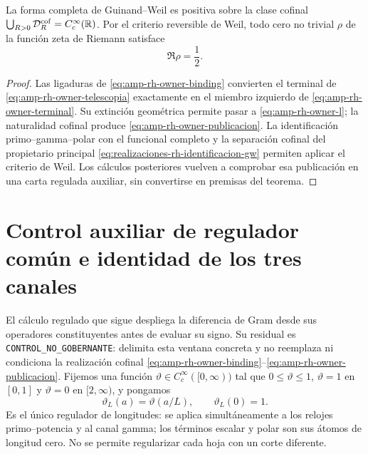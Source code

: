 \begin{theorem}
\label{thm:amp-rh-cierre-cofinal-propietario}
La forma completa de Guinand--Weil es positiva sobre la clase cofinal
\(\bigcup_{R>0}\mathcal D_R^{\rm cof}=C_c^\infty(\mathbb R)\). Por el
criterio reversible de Weil, todo cero no trivial \(\rho\) de la función
zeta de Riemann satisface
\[
 \Re\rho=\frac12.
\]
\end{theorem}

\begin{proof}
Las ligaduras de \eqref{eq:amp-rh-owner-binding} convierten el terminal de
\eqref{eq:amp-rh-owner-telescopia} exactamente en el miembro izquierdo de
\eqref{eq:amp-rh-owner-terminal}. Su extinción geométrica permite pasar a
\eqref{eq:amp-rh-owner-l}; la naturalidad cofinal produce
\eqref{eq:amp-rh-owner-publicacion}. La identificación primo--gamma--polar
con el funcional completo y la separación cofinal del propietario principal
\eqref{eq:realizaciones-rh-identificacion-gw} permiten aplicar el criterio de
Weil. Los cálculos posteriores vuelven a comprobar esa publicación en una
carta regulada auxiliar, sin convertirse en premisas del teorema.
\end{proof}

\section*{Control auxiliar de regulador común e identidad de los tres canales}

El cálculo regulado que sigue despliega la diferencia de Gram desde sus
operadores constituyentes antes de evaluar su signo. Su residual es
\texttt{CONTROL\_NO\_GOBERNANTE}: delimita esta ventana concreta y no
reemplaza ni condiciona la realización cofinal
\eqref{eq:amp-rh-owner-binding}--\eqref{eq:amp-rh-owner-publicacion}.
Fijemos una función
\(\vartheta\in C_c^\infty([0,\infty))\) tal que
\(0\leq\vartheta\leq1\), \(\vartheta=1\) en \([0,1]\) y
\(\vartheta=0\) en \([2,\infty)\), y pongamos
\[
 \vartheta_L(a)=\vartheta(a/L),\qquad \vartheta_L(0)=1 .
\]
Es el único regulador de longitudes: se aplica simultáneamente a los
relojes primo--potencia y al canal gamma; los términos escalar y polar son
sus átomos de longitud cero. No se permite regularizar cada hoja con un
corte diferente.

